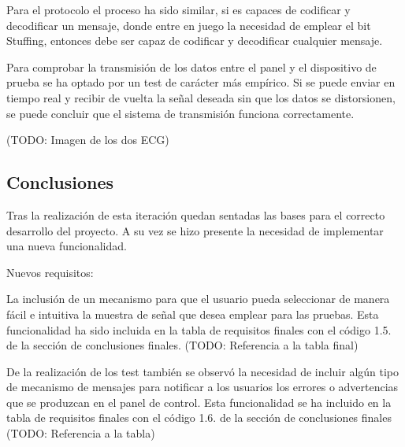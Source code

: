         Para el protocolo el proceso ha sido similar, si es capaces de codificar y decodificar un mensaje, donde entre en juego la necesidad de emplear el bit Stuffing, entonces debe ser capaz de codificar y decodificar cualquier mensaje.

        Para comprobar la transmisión de los datos entre el panel y el dispositivo de prueba se ha optado por un test de carácter más empírico. Si se puede enviar en tiempo real y recibir de vuelta la señal deseada sin que los datos se distorsionen, se puede concluir que el sistema de transmisión funciona correctamente.

        (TODO: Imagen de los dos ECG)


    \subsection{Conclusiones}

        Tras la realización de esta iteración quedan sentadas las bases para el correcto desarrollo del proyecto. A su vez se hizo presente la necesidad de implementar una nueva funcionalidad.

        Nuevos requisitos:

        La inclusión de un mecanismo para que el usuario pueda seleccionar de manera fácil e intuitiva la muestra de señal que desea emplear para las pruebas. Esta funcionalidad ha sido incluida en la tabla de requisitos finales con el código 1.5. de la sección de conclusiones finales. (TODO: Referencia a la tabla final)

        De la realización de los test también se observó la necesidad de incluir algún tipo de mecanismo de mensajes para notificar a los usuarios los errores o advertencias que se produzcan en el panel de control. Esta funcionalidad se ha incluido en la tabla de requisitos finales con el código 1.6. de la sección de conclusiones finales (TODO: Referencia a la tabla)
        